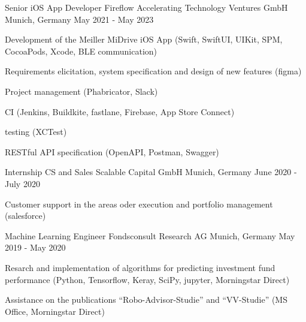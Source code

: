 


\begin{cventries}


\cventry
{Senior iOS App Developer} %
{Fireflow Accelerating Technology Ventures GmbH} %
{Munich, Germany} %
{May 2021 - May 2023} %
{ %
\begin{cvitems}
\item {Development of the Meiller MiDrive iOS App (Swift, SwiftUI, UIKit, SPM, CocoaPods, Xcode, BLE communication)}
\item {Requirements elicitation, system specification and design of new features (figma)}
\item {Project management (Phabricator, Slack)}
\item {CI (Jenkins, Buildkite, fastlane, Firebase, App Store Connect)}
\item {testing (XCTest)}
\item {RESTful API specification (OpenAPI, Postman, Swagger)}
\end{cvitems}
}


\cventry
{Internship CS and Sales} %
{Scalable Capital GmbH} %
{Munich, Germany} %
{June 2020 - July 2020} %
{ %
\begin{cvitems}
\item {Customer support in the areas oder execution and portfolio management (salesforce)}
\end{cvitems}
}


\cventry
{Machine Learning Engineer} %
{Fondsconsult Research AG} %
{Munich, Germany} %
{May 2019 - May 2020} %
{ %
\begin{cvitems}
\item {Resarch and implementation of algorithms for predicting  investment fund performance (Python, Tensorflow, Keray, SciPy, jupyter, Morningstar Direct)}
\item {Assistance on the publications ``Robo-Advisor-Studie'' and ``VV-Studie'' (MS Office, Morningstar Direct)}
\end{cvitems}
}


\end{cventries}
